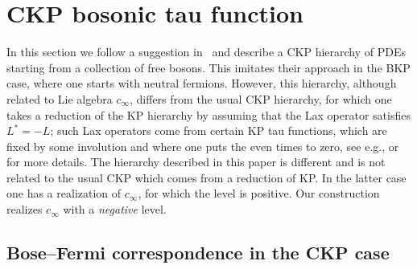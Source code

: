 \documentclass[pdftex]{sigma}
\numberwithin{equation}{section}
\begin{document}
\section{CKP bosonic tau function\label{CKPbosonic}}

In this section we follow a suggestion in~\cite{DJKMVI} and describe a CKP hierarchy of PDEs starting from  a collection of free bosons.
This imitates their approach in the BKP case, where one starts with neutral fermions.
However, this hierarchy, although related to Lie algebra $c_\infty$,
dif\/fers from the usual CKP hierarchy, for which one takes
a reduction of the KP hierarchy by assuming that the Lax operator
satisf\/ies $L^*=-L$; such Lax operators come from certain KP tau functions,
which are f\/ixed by some involution and where one puts the even times to zero,
see e.g., \cite{DJKMVI} or \cite{AL} for more details.
The hierarchy described in this paper is dif\/ferent and is not related to the
usual CKP which comes from a reduction of KP. In the latter case
one has a realization of $c_\infty$, for which the level is positive.
Our construction realizes  $c_\infty$ with a {\it negative\/} level.

\subsection[Bose-Fermi correspondence in the CKP case]{Bose--Fermi correspondence in the CKP case}\label{Bose-Fermi}
\end{document}
